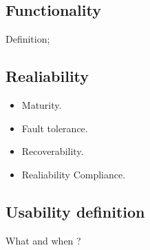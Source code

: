 \documentclass[11pt]{scrartcl}
\begin{document}
\subsection{Functionality}

Definition; %

\subsection{Realiability}

\begin{itemize}
    \item Maturity.
    \item Fault tolerance.
    \item Recoverability.
    \item Realiability Compliance.
\end{itemize}

\subsection{Usability definition}

What and when ?

\end{document}

